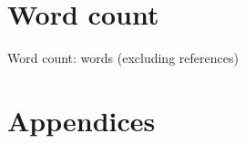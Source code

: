 \documentclass[a4paper, 12pt]{article}
\begin{document}
\section*{Word count}
Word count:  words (excluding references)
\\


\newpage
\appendix
\section*{Appendices}

\end{document}
